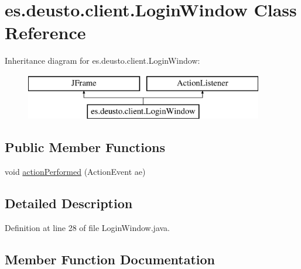 \hypertarget{classes_1_1deusto_1_1client_1_1_login_window}{}\section{es.\+deusto.\+client.\+Login\+Window Class Reference}
\label{classes_1_1deusto_1_1client_1_1_login_window}
Inheritance diagram for es.\+deusto.\+client.\+Login\+Window\+:\begin{figure}[H]
\begin{center}
\leavevmode
\includegraphics[height=2.000000cm]{classes_1_1deusto_1_1client_1_1_login_window}
\end{center}
\end{figure}
\subsection*{Public Member Functions}
\begin{DoxyCompactItemize}
\item 
void \hyperlink{classes_1_1deusto_1_1client_1_1_login_window_ab04df7b435aff20c1a87e417fc9b9e2a}{action\+Performed} (Action\+Event ae)
\end{DoxyCompactItemize}


\subsection{Detailed Description}


Definition at line 28 of file Login\+Window.\+java.



\subsection{Member Function Documentation}
\mbox{\label{classes_1_1deusto_1_1client_1_1_login_window_ab04df7b435aff20c1a87e417fc9b9e2a}} 
